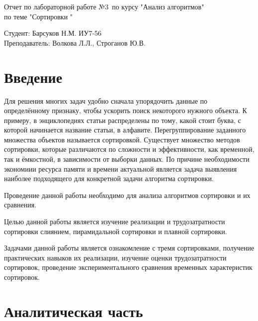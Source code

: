 \documentclass[12pt,a4paper]{scrartcl}
\begin{document}
	\begin{titlepage}
		\begin{center}
			\begin{LARGE}
				Отчет по лабораторной работе №3\
				по курсу "Анализ алгоритмов"\\
				по теме "Сортировки "
			\end{LARGE}
			
			\begin{Large}
				\vspace{10cm}
				Студент: Барсуков Н.М. ИУ7-56\\
				Преподаватель: Волкова Л.Л.,
				Строганов Ю.В.
			\end{Large}
		\end{center}
	\end{titlepage}
	
	\newpage
	\tableofcontents
	
	\newpage
	\section*{Введение}
		
		Для решения многих задач удобно сначала упорядочить данные по определённому признаку, чтобы ускорить поиск некоторого нужного объекта. К примеру, в энциклопедиях статьи распределены по тому, какой стоит буква, с которой начинается название статьи, в алфавите. Перегруппирование заданного множества объектов называется сортировкой. Существует множество методов сортировки, которые различаются по сложности и эффективности, как временной, так и ёмкостной, в зависимости от выборки данных. По причине необходимости экономиии ресурса памяти и времени актуальной является задача выявления наиболее подходящего для конкретной задачи алгоритма сортировки.

		Проведение данной работы необходимо для анализа алгоритмов сортировки и их сравнения.
		
		Целью данной работы является изучение реализации и трудозатратности сортировки слиянием, пирамидальной сортировки и плавной сортировки.
		
		Задачами данной работы является ознакомление с тремя сортировками, получение практических навыков их реализации, изучение оценки трудозатратности сортировок, проведение экспериментального сравнения временных характеристик сортировок.

	
	\newpage
	\section{Аналитическая часть}
	
\end{document}
